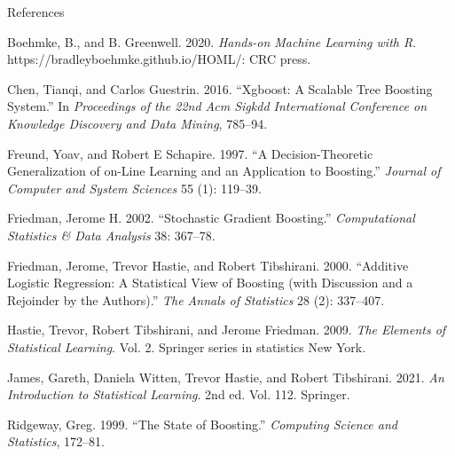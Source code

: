 \documentclass[
  10pt,
  ignorenonframetext,
]{beamer}
\newlength{\cslhangindent}
\newlength{\cslentryspacingunit} %
\newenvironment{CSLReferences}[2] %
 {%
  \setlength{\parindent}{0pt}
  \ifodd #1
  \let\oldpar\par
  \def\par{\hangindent=\cslhangindent\oldpar}
  \fi
  \setlength{\parskip}{#2\cslentryspacingunit}
 }%
 {}
\begin{document}
\begin{frame}{References}
\protect\hypertarget{references}{}
\tiny

\hypertarget{refs}{}
\begin{CSLReferences}{1}{0}
\leavevmode{}%
Boehmke, B., and B. Greenwell. 2020. \emph{Hands-on Machine Learning
with {R}}. https://bradleyboehmke.github.io/HOML/: CRC press.

\leavevmode{}%
Chen, Tianqi, and Carlos Guestrin. 2016. {``Xgboost: A Scalable Tree
Boosting System.''} In \emph{Proceedings of the 22nd Acm Sigkdd
International Conference on Knowledge Discovery and Data Mining},
785--94.

\leavevmode{}%
Freund, Yoav, and Robert E Schapire. 1997. {``A Decision-Theoretic
Generalization of on-Line Learning and an Application to Boosting.''}
\emph{Journal of Computer and System Sciences} 55 (1): 119--39.

\leavevmode{}%
Friedman, Jerome H. 2002. {``Stochastic Gradient Boosting.''}
\emph{Computational Statistics \& Data Analysis} 38: 367--78.

\leavevmode{}%
Friedman, Jerome, Trevor Hastie, and Robert Tibshirani. 2000.
{``Additive Logistic Regression: A Statistical View of Boosting (with
Discussion and a Rejoinder by the Authors).''} \emph{The Annals of
Statistics} 28 (2): 337--407.

\leavevmode{}%
Hastie, Trevor, Robert Tibshirani, and Jerome Friedman. 2009. \emph{The
Elements of Statistical Learning}. Vol. 2. Springer series in statistics
New York.

\leavevmode{}%
James, Gareth, Daniela Witten, Trevor Hastie, and Robert Tibshirani.
2021. \emph{An Introduction to Statistical Learning}. 2nd ed. Vol. 112.
Springer.

\leavevmode{}%
Ridgeway, Greg. 1999. {``The State of Boosting.''} \emph{Computing
Science and Statistics}, 172--81.

\end{CSLReferences}
\end{frame}
\end{document}
